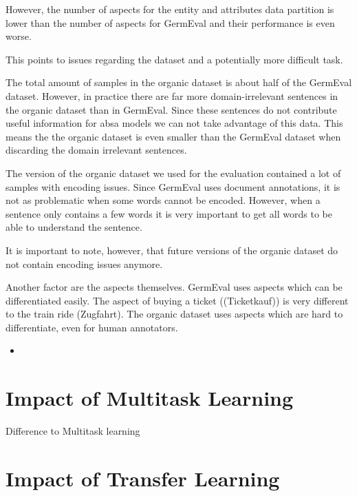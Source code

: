 However, the number of aspects for the entity and attributes data partition is lower than the number of aspects for GermEval and their performance is even worse.

This points to issues regarding the dataset and a potentially more difficult task. 
\medskip

The total amount of samples in the organic dataset is about half of the GermEval dataset. However, in practice there are far more domain-irrelevant sentences in the organic dataset than in GermEval. Since these sentences do not contribute useful information for \gls{absa} models we can not take advantage of this data. This means the the organic dataset is even smaller than the GermEval dataset when discarding the domain irrelevant sentences.
\medskip

The version of the organic dataset we used for the evaluation contained a lot of samples with encoding issues. Since GermEval uses document annotations, it is not as problematic when some words cannot be encoded. However, when a sentence only contains a few words it is very important to get all words to be able to understand the sentence. 

It is important to note, however, that future versions of the organic dataset do not contain encoding issues anymore.
\medskip

Another factor are the aspects themselves. GermEval uses aspects which can be differentiated easily. The aspect of buying a ticket {((Ticketkauf))} is very different to the train ride {(Zugfahrt)}. The organic dataset uses aspects which are hard to differentiate, even for human annotators. 


\begin{itemize}
	\item 
\end{itemize}

\section{Impact of Multitask Learning}
\label{sec:06_ResultsMultitask}

Difference to Multitask learning


\section{Impact of Transfer Learning}
\label{sec:06_ResultsTransfer}


